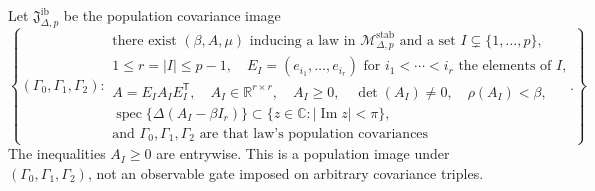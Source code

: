 Let \(\mathfrak J_{\Delta,p}^{\mathrm{ib}}\) be the population covariance image
\[
 \left\{(\Gamma_0,\Gamma_1,\Gamma_2):\begin{array}{l}
 \text{there exist }(\beta,A,\mu)\text{ inducing a law in }\mathcal M_{\Delta,p}^{\mathrm{stab}}\text{ and a set }I\subsetneq\{1,\ldots,p\},\\
 1\leq r=|I|\leq p-1,\quad E_I=(e_{i_1},\ldots,e_{i_r})\text{ for }i_1<\cdots<i_r\text{ the elements of }I,\\
 A=E_IA_IE_I^{\mathsf T},\quad A_I\in\mathbb R^{r\times r},\quad A_I\geq0,\quad \det(A_I)\neq0,\quad \rho(A_I)<\beta,\\
 \operatorname{spec}\{\Delta(A_I-\beta I_r)\}\subset\{z\in\mathbb C:|\operatorname{Im}z|<\pi\},\\
 \text{and }\Gamma_0,\Gamma_1,\Gamma_2\text{ are that law's population covariances}
 \end{array}\right\}.
\]
The inequalities \(A_I\geq0\) are entrywise.  This is a population image under \((\Gamma_0,\Gamma_1,\Gamma_2)\), not an observable gate imposed on arbitrary covariance triples.